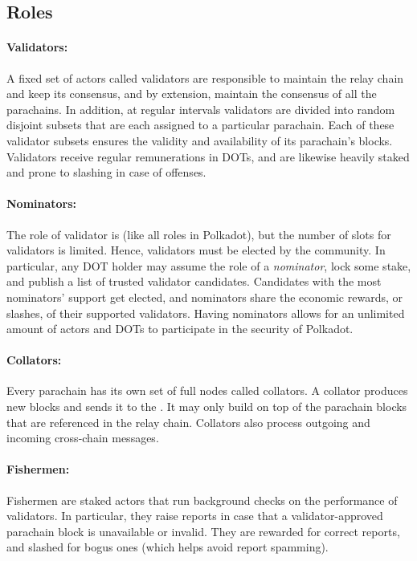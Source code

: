 \subsection{Roles}

\paragraph{Validators:} A fixed set of actors called validators are responsible to maintain the relay chain
and keep its consensus, and by extension, maintain the consensus of all the parachains.
In addition, at regular intervals validators are divided into random disjoint subsets
that are each assigned to a particular parachain.
Each of these validator subsets ensures the validity and availability of its parachain's blocks.
Validators receive regular remunerations in DOTs,
and are likewise heavily staked and prone to slashing in case of offenses.

\paragraph{Nominators:} The role of validator is 
 (like all roles in Polkadot),
but the number of slots for validators is limited. Hence, validators must be elected by the community.
In particular, any DOT holder may assume the role of a \emph{nominator}, lock some stake, and publish a list
of trusted validator candidates. Candidates with the most nominators' support get elected,
and nominators share the economic rewards, or slashes, of their supported validators.
Having nominators allows for an unlimited amount of actors and DOTs to participate in the security of Polkadot.

\paragraph{Collators: } Every parachain has its own set of full nodes called collators.
A collator produces new blocks and sends it to the .
It may only build on top of the parachain blocks that are referenced in the relay chain.
Collators also process outgoing and incoming cross-chain messages.

\paragraph{Fishermen:} Fishermen are staked actors that run background checks on the performance of validators.
In particular, they raise reports in case that a validator-approved parachain block is unavailable or invalid.
They are rewarded for correct reports, and slashed for bogus ones (which helps avoid report spamming).




